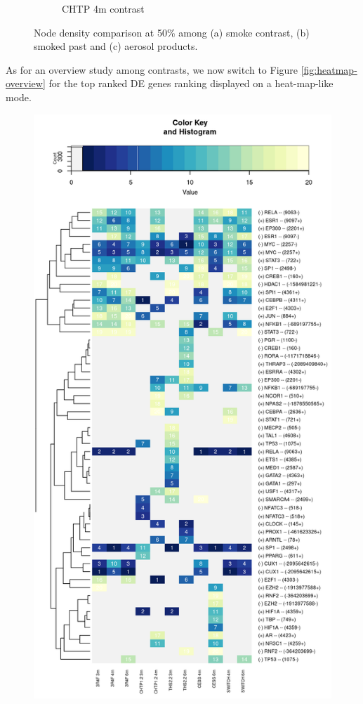 \begin{figure}
\begin{subfigure}{0.3\linewidth}
            \caption{CHTP 4m contrast}
            \label{img:non-smoke}
    \end{subfigure}
    
    \caption{Node density comparison at 50\% among (a) smoke contrast, (b) smoked past and (c) aerosol products.}
    \label{fig:compare-density}
\end{figure}

As for an overview study among contrasts, we now switch to Figure \ref{fig:heatmap-overview} for the top ranked DE genes ranking displayed on a heat-map-like mode.

\begin{figure}
    \centering
    \includegraphics[width=\textwidth, height=\textheight, keepaspectratio]{Major Thesis/figures/iut/heat/heatmap-contrasts.png}

\end{figure}
